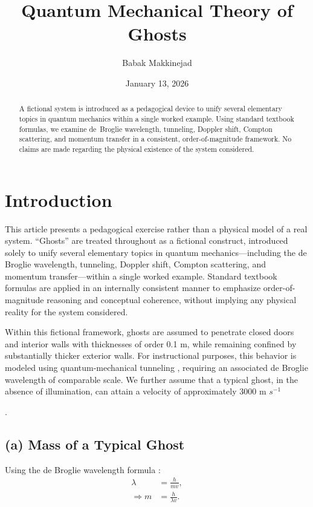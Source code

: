 \documentclass[10pt,a4paper]{article}
\title{\textbf{Quantum Mechanical Theory of Ghosts}}
\author{Babak Makkinejad}
\date{January 13, 2026}
\begin{document}
\maketitle
\begin{abstract}
A fictional system is introduced as a pedagogical device to unify several elementary topics in quantum mechanics within a single worked example. Using standard textbook formulas, we examine de~Broglie wavelength, tunneling, Doppler shift, Compton scattering, and momentum transfer in a consistent, order-of-magnitude framework. No claims are made regarding the physical existence of the system considered.
\end{abstract}

\section*{Introduction}
This article presents a pedagogical exercise rather than a physical model of a real system. “Ghosts” are treated throughout as a fictional construct, introduced solely to unify several elementary topics in quantum mechanics—including the de Broglie wavelength, tunneling, Doppler shift, Compton scattering, and momentum transfer—within a single worked example. Standard textbook formulas are applied in an internally consistent manner to emphasize order-of-magnitude reasoning and conceptual coherence, without implying any physical reality for the system considered.

Within this fictional framework, ghosts are assumed to penetrate closed doors and interior walls with thicknesses of order 0.1 m, while remaining confined by substantially thicker exterior walls. For instructional purposes, this behavior is modeled using quantum-mechanical tunneling \cite{GriffithsQM}, requiring an associated de Broglie wavelength of comparable scale. We further assume that a typical ghost, in the absence of illumination, can attain a velocity of approximately 3000 m $s^{-1}$

.

\vspace{2mm}
\subsection*{(a) Mass of a Typical Ghost}

Using the de Broglie wavelength formula \cite{SakuraiQM}:
\begin{align}
\lambda &= \frac{h}{m v}, \\
\Rightarrow m &= \frac{h}{\lambda v}.
\end{align}
\end{document}
